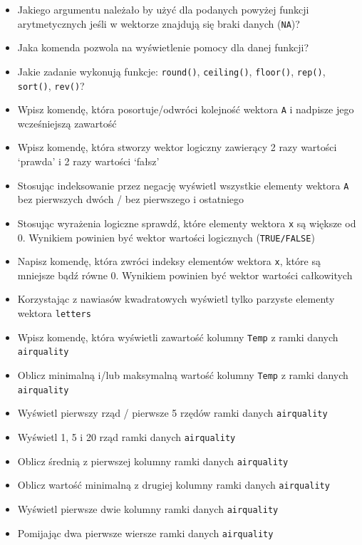 \documentclass[]{book}
\providecommand{\tightlist}{%
  \setlength{\itemsep}{0pt}\setlength{\parskip}{0pt}}
\theoremstyle{definition}
\theoremstyle{definition}
\theoremstyle{definition}
\theoremstyle{remark}
\begin{document}
\begin{itemize}
\tightlist
\item
  Jakiego argumentu należało by użyć dla podanych powyżej funkcji
  arytmetycznych jeśli w wektorze znajdują się braki danych
  (\texttt{NA})?
\item
  Jaka komenda pozwola na wyświetlenie pomocy dla danej funkcji?
\item
  Jakie zadanie wykonują funkcje: \texttt{round()}, \texttt{ceiling()},
  \texttt{floor()}, \texttt{rep()}, \texttt{sort()}, \texttt{rev()}?
\item
  Wpisz komendę, która posortuje/odwróci kolejność wektora \texttt{A} i
  nadpisze jego wcześniejszą zawartość
\item
  Wpisz komendę, która stworzy wektor logiczny zawierący 2 razy wartości
  `prawda' i 2 razy wartości `fałsz'
\item
  Stosując indeksowanie przez negację wyświetl wszystkie elementy
  wektora \texttt{A} bez pierwszych dwóch / bez pierwszego i ostatniego
\item
  Stosując wyrażenia logiczne sprawdź, które elementy wektora \texttt{x}
  są większe od 0. Wynikiem powinien być wektor wartości logicznych
  (\texttt{TRUE/FALSE})
\item
  Napisz komendę, która zwróci indeksy elementów wektora \texttt{x},
  które są mniejsze bądź równe 0. Wynikiem powinien być wektor wartości
  całkowitych
\item
  Korzystając z nawiasów kwadratowych wyświetl tylko parzyste elementy
  wektora \texttt{letters}
\item
  Wpisz komendę, która wyświetli zawartość kolumny \texttt{Temp} z ramki
  danych \texttt{airquality}
\item
  Oblicz minimalną i/lub maksymalną wartość kolumny \texttt{Temp} z
  ramki danych \texttt{airquality}
\item
  Wyświetl pierwszy rząd / pierwsze 5 rzędów ramki danych
  \texttt{airquality}
\item
  Wyświetl 1, 5 i 20 rząd ramki danych \texttt{airquality}
\item
  Oblicz średnią z pierwszej kolumny ramki danych \texttt{airquality}
\item
  Oblicz wartość minimalną z drugiej kolumny ramki danych
  \texttt{airquality}
\item
  Wyświetl pierwsze dwie kolumny ramki danych \texttt{airquality}
\item
  Pomijając dwa pierwsze wiersze ramki danych \texttt{airquality}

\end{itemize}
\end{document}
